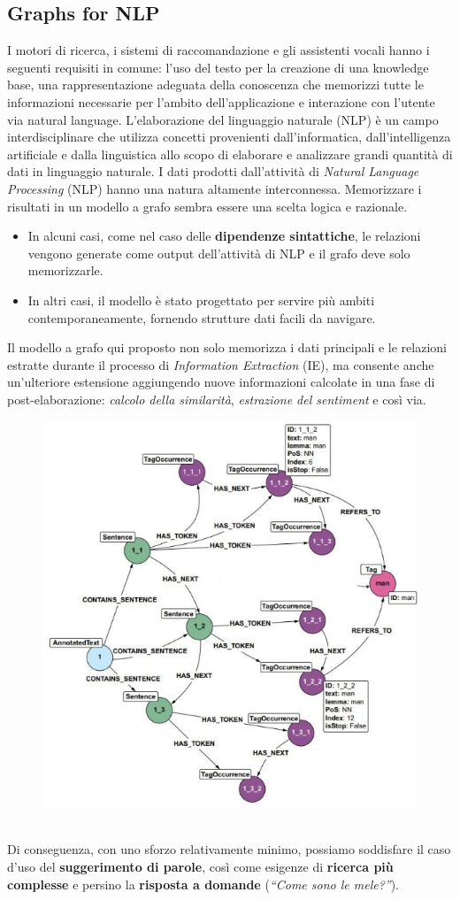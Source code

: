 \subsection{Graphs for NLP}
I motori di ricerca, i sistemi di raccomandazione e gli assistenti vocali hanno i seguenti requisiti in comune: l'uso del testo per la creazione di una knowledge base, una rappresentazione adeguata della conoscenza che memorizzi tutte le informazioni necessarie per l'ambito dell'applicazione e interazione con l'utente via natural language. L'elaborazione del linguaggio naturale (NLP) è un campo interdisciplinare che utilizza concetti provenienti dall'informatica, dall'intelligenza artificiale e dalla linguistica allo scopo di elaborare e analizzare grandi quantità di dati in linguaggio naturale.
I dati prodotti dall'attività di \textit{Natural Language Processing} (NLP) hanno una natura altamente interconnessa. Memorizzare i risultati in un modello a grafo sembra essere una scelta logica e razionale.
\begin{itemize}
  \item In alcuni casi, come nel caso delle \textbf{dipendenze sintattiche}, le relazioni vengono generate come output dell'attività di NLP e il grafo deve solo memorizzarle.
  \item In altri casi, il modello è stato progettato per servire più ambiti contemporaneamente, fornendo strutture dati facili da navigare.
\end{itemize}
\newpage
Il modello a grafo qui proposto non solo memorizza i dati principali e le relazioni estratte durante il processo di \textit{Information Extraction} (IE), ma consente anche un'ulteriore estensione aggiungendo nuove informazioni calcolate in una fase di post-elaborazione: \textit{calcolo della similarità}, \textit{estrazione del sentiment} e così via.
\\
\begin{figure}[th]
    \centering
    \includegraphics[width=0.5\linewidth]{RecommendationsGraph//img/graphfornlp.png}
\end{figure}
\\
Di conseguenza, con uno sforzo relativamente minimo, possiamo soddisfare il caso d'uso del \textbf{suggerimento di parole}, così come esigenze di \textbf{ricerca più complesse} e persino la \textbf{risposta a domande} (\textit{``Come sono le mele?''}).


